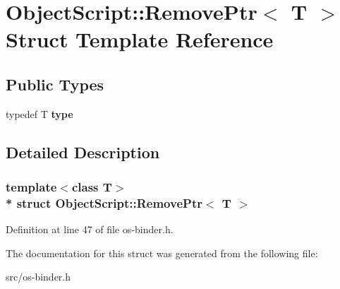 \hypertarget{struct_object_script_1_1_remove_ptr}{}\section{Object\+Script\+:\+:Remove\+Ptr$<$ T $>$ Struct Template Reference}
\label{struct_object_script_1_1_remove_ptr}
\subsection*{Public Types}
\begin{DoxyCompactItemize}
\item 
typedef T {\bfseries type}\hypertarget{struct_object_script_1_1_remove_ptr_ad274f64e3de1538bd6e2822e006e2ec0}{}\label{struct_object_script_1_1_remove_ptr_ad274f64e3de1538bd6e2822e006e2ec0}

\end{DoxyCompactItemize}


\subsection{Detailed Description}
\subsubsection*{template$<$class T$>$\\*
struct Object\+Script\+::\+Remove\+Ptr$<$ T $>$}



Definition at line 47 of file os-\/binder.\+h.



The documentation for this struct was generated from the following file\+:\begin{DoxyCompactItemize}
\item 
src/os-\/binder.\+h\end{DoxyCompactItemize}
